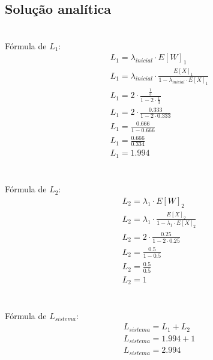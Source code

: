 \documentclass[12pt,a4paper]{article}
\begin{document}
\subsection{Solução analítica}

\noindent
\\
Fórmula de \(L_{1}\):
\begin{equation*}
	\begin{aligned}
		&L_{1} = \lambda_{inicial} \cdot {E[W]_{1}} \\
		&L_{1} = {\lambda_{inicial}} \cdot \frac{E[X]_{1}}{1-{\lambda_{inicial}}\cdot{E[X]_{1}}} \\
		&L_{1} = {2} \cdot \frac{\frac{1}{3}}{1-{2}\cdot{\frac{1}{3}}} \\
		&L_{1} = {2} \cdot \frac{0.333}{1-{2}\cdot{0.333}} \\
		&L_{1} = \frac{0.666}{1-0.666} \\
		&L_{1} = \frac{0.666}{0.334} \\
		&L_{1} = 1.994 \\
	\end{aligned}
\end{equation*}

\noindent
\\
Fórmula de \(L_{2}\):
\begin{equation*}
	\begin{aligned}
		&L_{2} = \lambda_{1} \cdot {E[W]_{2}} \\
		&L_{2} = {\lambda_{1}} \cdot \frac{E[X]_{2}}{1-{\lambda_{1}}\cdot{E[X]_{2}}} \\
		&L_{2} = {2} \cdot \frac{0.25}{1-{2}\cdot{0.25}} \\
		&L_{2} = \frac{0.5}{1-0.5} \\
		&L_{2} = \frac{0.5}{0.5} \\
		&L_{2} = 1 \\
	\end{aligned}
\end{equation*}

\noindent
\\
Fórmula de \(L_{sistema}\):
\begin{equation*}
	\begin{aligned}
		&L_{sistema} = L_{1} + L_{2} \\
		&L_{sistema} = 1.994 + 1 \\
		&L_{sistema} = 2.994 \\
	\end{aligned}
\end{equation*}
\end{document}
